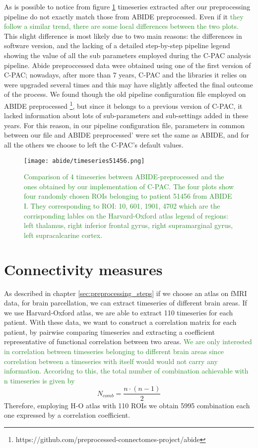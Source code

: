 \documentclass[11pt]{report}
\begin{document}
As is possible to notice from figure \ref{fig:confrontoabidepreproc} timeseries extracted after our preprocessing pipeline do not exactly match those from ABIDE preprocessed.
Even if it \textcolor{ForestGreen}{they follow a similar trend, there are some local differences between the two plots.}
This slight difference is most likely due to two main reasons: the differences in software version, and the lacking of a detailed step-by-step pipeline legend showing the value of all the sub parameters employed during the C-PAC analysis pipeline.
Abide preproccessed data were obtained using one of the first version of C-PAC; nowadays, after more than 7 years, C-PAC and the libraries it relies on were upgraded several times and this may have slightly affected the final outcome of the process.
We found though the old pipeline configuration file employed on ABIDE preprocessed \footnote{https://github.com/preprocessed-connectomes-project/abide}, but since it belongs to a previous version of C-PAC, it lacked information about lots of sub-parameters and sub-settings added in these years.
For this reason, in our pipeline configuration file, parameters in common between our file and ABIDE preprocessed' were set the same as ABIDE, and for all the others we choose to left the C-PAC's default values.

\begin{figure}[h]
\centering
\texttt{[image: abide/timeseries51456.png]}
\caption{\textcolor{ForestGreen}{Comparison of 4 timeseries between ABIDE-preprocessed and the ones obtained by our implementation of C-PAC. The four plots show four randomly chosen ROIs belonging to patient 51456 from ABIDE I. They corresponding to ROI: 10, 601, 1901, 4702 which are the corrisponding lables on the Harvard-Oxford atlas legend of regions: left thalamus, right inferior frontal gyrus, right supramarginal gyrus, left supracalcarine cortex.}}
\label{fig:confrontoabidepreproc}
\end{figure}



\chapter{Connectivity measures}\label{chap:connectivity_coefficients}
As described in chapter \ref{sec:preprocessing_steps} if we choose an atlas on fMRI data, for brain parcellation, we can extract timeseries of different brain areas. If we use Harvard-Oxford atlas, we are able to extract 110 timeseries for each patient.
With these data, we want to construct a correlation matrix for each patient, by pairwise comparing timeseries and extracting a coefficient representative of functional correlation between two areas.
\textcolor{ForestGreen}{We are only interested in correlation between timeseries belonging to different brain areas since correlation between a timeseries with itself would would not carry any information.
Accoridng to this, the total number of combination achievable with n timeseries is given by
}
\begin{equation}
N_{comb} = \frac{n\cdot(n-1)}{2}
\end{equation}
Therefore, employing H-O atlas with 110 ROIs we obtain 5995 combination each one expressed by a correlation coefficient.
\end{document}
